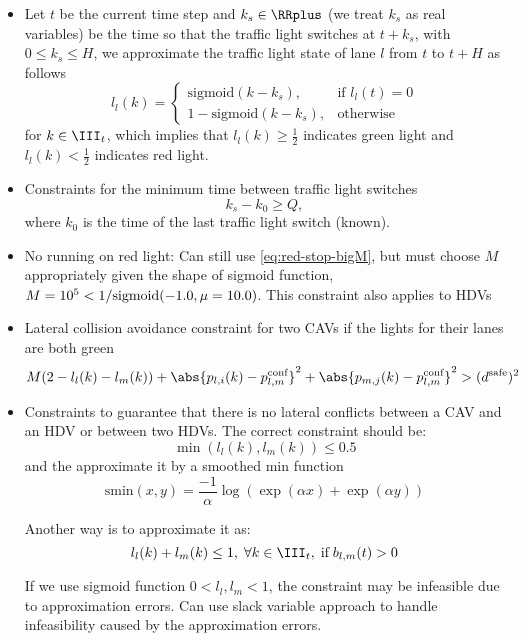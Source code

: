 \begin{itemize}
\item Let $t$ be the current time step and $k_s  \in \RRplus$ (we treat $k_s$ as real variables) be the time so that the traffic light switches at $t+k_s$, with $0 \le k_s \le H$, we approximate the traffic light state of lane $l$ from $t$ to $t+H$ as follows
\begin{equation}
l_l (k) =
\begin{cases}
\mathrm{sigmoid} (k-k_s), & \text{if } l_l (t) = 0 \\
1 - \mathrm{sigmoid} (k-k_s), & \text{otherwise}
\end{cases}     
\end{equation}
for $k \in \III_t$, which implies that $l_l (k) \ge \frac{1}{2}$ indicates green light and $l_l (k) < \frac{1}{2}$ indicates red light. 

\item Constraints for the minimum time between traffic light switches
\begin{equation}
k_s - k_{0} \ge Q,
\end{equation}
where $k_0$ is the time of the last traffic light switch (known).

\item No running on red light: Can still use \eqref{eq:red-stop-bigM}, but must choose $M$ appropriately given the shape of sigmoid function, \eg ${M = 10^5 < 1/\rm{sigmoid}(-1.0, \mu = 10.0)}$.
This constraint also applies to HDVs

\item Lateral collision avoidance constraint for two CAVs if the lights for their lanes are both green
\begin{equation}
M(2-l_l(k)-l_m(k)) + \abs{p_{l,i}(k) - p_{l,m}^{\text{conf}}}^2 + \abs{p_{m,j}(k) - p_{l,m}^{\text{conf}}}^2 > (d^{\text{safe}})^2 
\end{equation}

\item Constraints to guarantee that there is no lateral conflicts between a CAV and an HDV or between two HDVs. 
The correct constraint should be:
\begin{equation}
\min (l_l(k), l_m(k)) \le 0.5
\end{equation}
and the approximate it by a smoothed min function
\begin{equation}
\mathrm{smin}(x, y) = \frac{-1}{\alpha} \log (\exp{(\alpha x)} + \exp{(\alpha y)})
\end{equation}

Another way is to approximate it as:
\begin{equation}
l_l (k) + l_m (k) \le 1, \; \forall k \in \III_t, \;\text{if}\; b_{l,m} (t) > 0 
\end{equation}

If we use sigmoid function $0 < l_l, l_m < 1$, the constraint may be infeasible due to approximation errors.
Can use slack variable approach to handle infeasibility caused by the approximation errors.
\end{itemize}

